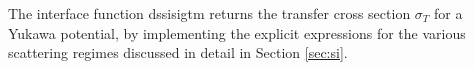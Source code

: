 \documentclass[a4paper,10pt,oneside]{book}
\newcommand{\code}[1]{\ft{#1}}
\newcommand{\ft}[1]{\textsf{#1}}
\begin{document}
\label{ch:vdSIDM_si}

The interface function \code{dssisigtm} returns the transfer cross section $\sigma_T$ for a Yukawa potential, by implementing
the explicit expressions for the various scattering regimes discussed in detail in Section \ref{sec:si}.%













\end{document}
